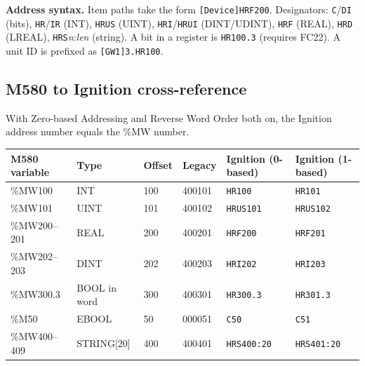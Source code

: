 \textbf{Address syntax.} Item paths take the form \texttt{[Device]HRF200}. Designators: \texttt{C}/\texttt{DI} (bits), \texttt{HR}/\texttt{IR} (INT), \texttt{HRUS} (UINT), \texttt{HRI}/\texttt{HRUI} (DINT/UDINT), \texttt{HRF} (REAL), \texttt{HRD} (LREAL), \texttt{HRS}\textit{n}:\textit{len} (string). A bit in a register is \texttt{HR100.3} (requires FC22). A unit ID is prefixed as \texttt{[GW1]3.HR100}.

\subsection*{M580 to Ignition cross-reference}
With Zero-based Addressing and Reverse Word Order both on, the Ignition address number equals the \%MW number.
\begin{longtable}{@{}P{3.59cm}P{2.20cm}P{1.60cm}P{2.00cm}P{2.59cm}P{2.40cm}@{}}
\toprule
\textbf{M580 variable} & \textbf{Type} & \textbf{Offset} & \textbf{Legacy} & \textbf{Ignition (0-based)} & \textbf{Ignition (1-based)} \\
\midrule
\endhead
\%MW100 & INT & 100 & 400101 & \texttt{HR100} & \texttt{HR101} \\
\%MW101 & UINT & 101 & 400102 & \texttt{HRUS101} & \texttt{HRUS102} \\
\%MW200--201 & REAL & 200 & 400201 & \texttt{HRF200} & \texttt{HRF201} \\
\%MW202--203 & DINT & 202 & 400203 & \texttt{HRI202} & \texttt{HRI203} \\
\%MW300.3 & BOOL in word & 300 & 400301 & \texttt{HR300.3} & \texttt{HR301.3} \\
\%M50 & EBOOL & 50 & 000051 & \texttt{C50} & \texttt{C51} \\
\%MW400--409 & STRING[20] & 400 & 400401 & \texttt{HRS400:20} & \texttt{HRS401:20} \\
\bottomrule
\end{longtable}

